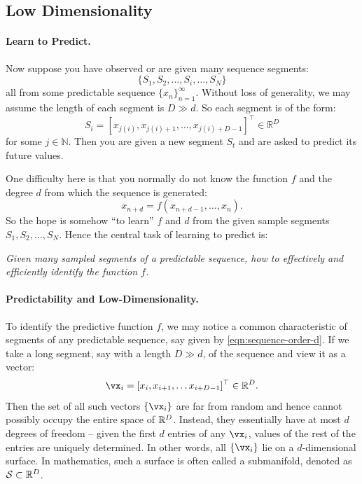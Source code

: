 \documentclass[../../book-main.tex]{subfiles}
\begin{document}
\subsection{Low Dimensionality}\label{sec:intro-low-dimensionality}
\paragraph{Learn to Predict.}
Now suppose you have observed or are given many sequence segments:
\begin{equation}
    \{S_1, S_2, \ldots, S_i, \ldots, S_N\}
\end{equation}
all from some predictable sequence $\{x_n\}_{n=1}^\infty$. Without loss of generality, we may assume the length of each segment is $D \gg d$. So each segment is of the form:
\begin{equation}
    S_i = [x_{j(i)}, x_{j(i)+1}, \ldots, x_{j(i)+D-1}]^\top \in \mathbb{R}^D
\end{equation}
for some $j \in \mathbb{N}$. Then you are given a new segment $S_t$ and are asked to predict its future values. 

One difficulty here is that you normally do not know the function $f$ and the degree $d$ from which the sequence is generated: 
\begin{equation}
    x_{n+d} = f(x_{n+d-1}, \ldots,  x_{n}).
\label{eqn:sequence-order-d}
\end{equation}
So the hope is somehow ``to learn'' $f$ and $d$ from the given sample segments $S_1, S_2, \ldots, S_N$. Hence the central task of learning to predict is:
\begin{center}
{\em Given many sampled segments of a predictable sequence, how to effectively and efficiently identify the function $f$.}
\end{center}

\paragraph{Predictability and Low-Dimensionality.}
To identify the predictive function $f$, we may notice a common characteristic of segments of any predictable sequence, say given by \eqref{eqn:sequence-order-d}. If we take a long segment, say with a length $D \gg d$, of the sequence and view it as a vector: 
\begin{equation}
    \vx_i = [x_i, x_{i+1}, \ldots x_{i+D-1}]^\top \in \mathbb{R}^D.
\end{equation}
Then the set of all such vectors $\{\vx_i\}$ are far from random and hence cannot possibly occupy the entire space of $\mathbb{R}^D$. Instead, they essentially have at most $d$ degrees of freedom -- given the first $d$ entries of any $\vx_i$, values of the rest of the entries are uniquely determined. In other words, all $\{\vx_i\}$ lie on a $d$-dimensional surface. In mathematics, such a surface is often called a submanifold, denoted as $\mathcal{S} \subset \mathbb{R}^D$.
\end{document}
